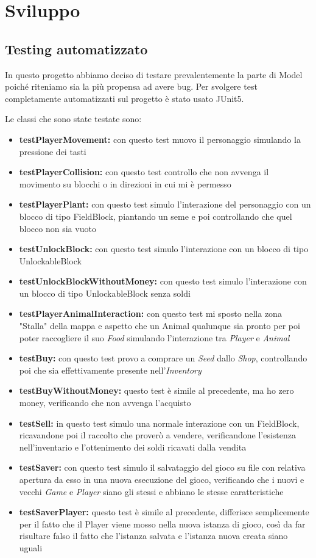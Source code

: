 \documentclass[a4paper,12pt]{report}
\begin{document}
\chapter{Sviluppo}
\section{Testing automatizzato}


In questo progetto abbiamo deciso di testare prevalentemente la parte di Model poiché riteniamo sia la più propensa ad avere bug. Per svolgere test completamente automatizzati sul progetto è stato usato JUnit5.

Le classi che sono state testate sono:
{
\begin{itemize}
	\item \textbf{testPlayerMovement:} con questo test muovo il personaggio simulando la pressione dei tasti  
	\item \textbf{testPlayerCollision:} con questo test controllo che non avvenga il movimento su blocchi o in direzioni in cui mi è permesso
	\item \textbf{testPlayerPlant:} con questo test simulo l'interazione del personaggio con un blocco di tipo FieldBlock, piantando un seme e poi controllando che quel blocco non sia vuoto
	\item \textbf{testUnlockBlock:} con questo test simulo l'interazione con un blocco di tipo UnlockableBlock
	\item \textbf{testUnlockBlockWithoutMoney:} con questo test simulo l'interazione con un blocco di tipo UnlockableBlock senza soldi
	\item \textbf{testPlayerAnimalInteraction:} con questo test mi sposto nella zona "Stalla" della mappa e aspetto che un Animal qualunque sia pronto per poi poter raccogliere il suo \textit{Food} simulando l'interazione tra \textit{Player} e \textit{Animal}
	\item \textbf{testBuy:} con questo test provo a comprare un \textit{Seed} dallo \textit{Shop}, controllando poi che sia effettivamente presente nell'\textit{Inventory}
	\item \textbf{testBuyWithoutMoney:} questo test è simile al precedente, ma ho zero money, verificando che non avvenga l'acquisto
	\item \textbf{testSell:} in questo test simulo una normale interazione con un FieldBlock, ricavandone poi il raccolto che proverò a vendere, verificandone l'esistenza nell'inventario e l'ottenimento dei soldi ricavati dalla vendita
	\item \textbf{testSaver:} con questo test simulo il salvataggio del gioco su file con relativa apertura da esso in una nuova esecuzione del gioco, verificando che i nuovi e vecchi \textit{Game} e \textit{Player} siano gli stessi e abbiano le stesse caratteristiche
	\item \textbf{testSaverPlayer:} questo test è simile al precedente, differisce semplicemente per il fatto che il Player viene mosso nella nuova istanza di gioco, così da far risultare falso il fatto che l'istanza salvata e l'istanza nuova creata siano uguali	
\end{itemize}
}
\end{document}
